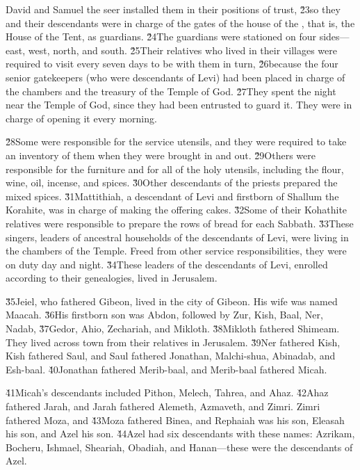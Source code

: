 David and Samuel the seer installed them in their positions of trust, \v{23}so they and their descendants were in charge of the gates of the house of the , that is, the House of the Tent, as guardians. \v{24}The guardians were stationed on four sides---east, west, north, and south. \v{25}Their relatives who lived in their villages were required to visit every seven days to be with them in turn, \v{26}because the four senior gatekeepers (who were descendants of Levi) had been placed in charge of the chambers and the treasury of the Temple of God. \v{27}They spent the night near the Temple of God, since they had been entrusted to guard it. They were in charge of opening it every morning.

\v{28}Some were responsible for the service utensils, and they were required to take an inventory of them when they were brought in and out. \v{29}Others were responsible for the furniture and for all of the holy utensils, including the flour, wine, oil, incense, and spices. \v{30}Other descendants of the priests prepared the mixed spices. \v{31}Mattithiah, a descendant of Levi and firstborn of Shallum the Korahite, was in charge of making the offering cakes. \v{32}Some of their Kohathite relatives were responsible to prepare the rows of bread for each Sabbath. \v{33}These singers, leaders of ancestral households of the descendants of Levi, were living in the chambers of the Temple. Freed from other service responsibilities, they were on duty day and night. \v{34}These leaders of the descendants of Levi, enrolled according to their genealogies, lived in Jerusalem.

\v{35}Jeiel, who fathered Gibeon, lived in the city of Gibeon. His wife was named Maacah. \v{36}His firstborn son was Abdon, followed by Zur, Kish, Baal, Ner, Nadab, \v{37}Gedor, Ahio, Zechariah, and Mikloth. \v{38}Mikloth fathered Shimeam. They lived across town from their relatives in Jerusalem. \v{39}Ner fathered Kish, Kish fathered Saul, and Saul fathered Jonathan, Malchi-shua, Abinadab, and Esh-baal. \v{40}Jonathan fathered Merib-baal, and Merib-baal fathered Micah.

\v{41}Micah's descendants included Pithon, Melech, Tahrea, and Ahaz. \v{42}Ahaz fathered Jarah, and Jarah fathered Alemeth, Azmaveth, and Zimri. Zimri fathered Moza, and \v{43}Moza fathered Binea, and Rephaiah was his son, Eleasah his son, and Azel his son. \v{44}Azel had six descendants with these names: Azrikam, Bocheru, Ishmael, Sheariah, Obadiah, and Hanan---these were the descendants of Azel.


